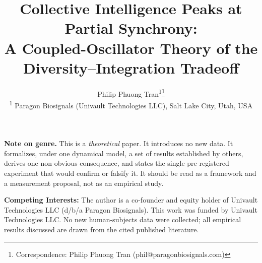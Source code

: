 \documentclass[11pt]{article}
\title{Collective Intelligence Peaks at Partial Synchrony:\\
A Coupled-Oscillator Theory of the Diversity--Integration Tradeoff}
\author{
  Philip Phuong Tran\textsuperscript{1}\thanks{Correspondence: Philip Phuong Tran (phil@paragonbiosignals.com)} \\[0.5em]
  \textsuperscript{1} Paragon Biosignals (Univault Technologies LLC), Salt Lake City, Utah, USA
}
\date{}
\begin{document}
\maketitle

\vspace{-1em}

\noindent\textbf{Note on genre.} This is a \emph{theoretical} paper. It introduces no new data. It formalizes, under one dynamical model, a set of results established by others, derives one non-obvious consequence, and states the single pre-registered experiment that would confirm or falsify it. It should be read as a framework and a measurement proposal, not as an empirical study.

\medskip

\noindent\textbf{Competing Interests:} The author is a co-founder and equity holder of Univault Technologies LLC (d/b/a Paragon Biosignals). This work was funded by Univault Technologies LLC. No new human-subjects data were collected; all empirical results discussed are drawn from the cited published literature.

\bigskip
\end{document}
